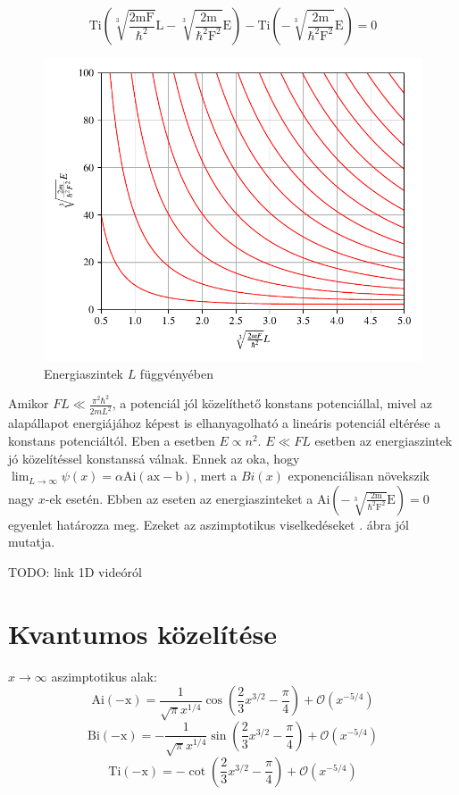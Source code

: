 \documentclass[a4paper,titlepage]{article}
\newcommand{\Ai}[1]{\mathrm{Ai\left(#1\right)}}
\newcommand{\Bi}[1]{\mathrm{Bi\left(#1\right)}}
\newcommand{\Ti}[1]{\mathrm{Ti\left(#1\right)}}
\begin{document}
	\begin{equation}
		\Ti{\sqrt[3]{\frac{2mF}{\hbar^2}}L - \sqrt[3]{\frac{2m}{\hbar^2F^2}}E} - \Ti{-\sqrt[3]{\frac{2m}{\hbar^2F^2}}E} = 0
	\end{equation}
	\begin{figure}[H]
		\includegraphics[scale=1]{./figs/energiaszintek.pdf}
		\caption{Energiaszintek $L$ függvényében}
		\label{box_energiaszintek_abra}
	\end{figure}
	Amikor $FL \ll \frac{\pi^2\hbar^2}{2mL^2}$, a potenciál jól közelíthető konstans potenciállal, mivel az alapállapot energiájához képest is elhanyagolható a lineáris potenciál eltérése a konstans potenciáltól. Eben a esetben $E \propto n^2$. $E \ll FL$ esetben az energiaszintek jó közelítéssel konstanssá válnak. Ennek az oka, hogy $\lim_{L \to \infty}\psi(x) = \alpha \Ai{ax-b}$, mert a $Bi(x)$ exponenciálisan növekszik nagy $x$-ek esetén. Ebben az eseten az energiaszinteket a $\Ai{- \sqrt[3]{\frac{2m}{\hbar^2F^2}}E} = 0$ egyenlet határozza meg. Ezeket az aszimptotikus viselkedéseket . ábra jól mutatja.
    
    TODO: link 1D videóról

\section{Kvantumos közelítése}
	$x \rightarrow \infty$ aszimptotikus alak:
	\begin{equation}
		\Ai{-x} = \frac{1}{\sqrt{\pi}x^{1/4}}\cos\left(\frac{2}{3}x^{3/2} - \frac{\pi}{4}\right) + \mathcal{O}\left(x^{-5/4}\right)
	\end{equation}
	\begin{equation}
		\Bi{-x} = -\frac{1}{\sqrt{\pi}x^{1/4}}\sin\left(\frac{2}{3}x^{3/2} - \frac{\pi}{4}\right) + \mathcal{O}\left(x^{-5/4}\right)
	\end{equation}
	\begin{equation}
		\Ti{-x} = -\cot\left( \frac{2}{3}x^{3/2} - \frac{\pi}{4} \right) + \mathcal{O}\left(x^{-5/4}\right)
	\end{equation}
	
\end{document}
